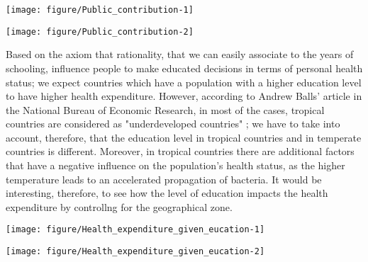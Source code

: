 \documentclass[12pt,a4paper]{article}\usepackage[]{graphicx}\usepackage[]{color}
\makeatletter
\def\maxwidth{ %
  \ifdim\Gin@nat@width>\linewidth
    \linewidth
  \else
    \Gin@nat@width
  \fi
}
\makeatother
\begin{document}
\texttt{[image: figure/Public\_contribution-1]} 

\texttt{[image: figure/Public\_contribution-2]} 


Based on the axiom that  rationality, that we can easily associate to the years of schooling, influence people to make educated decisions in terms of personal health status; we expect countries which have a population with a higher education level to have higher health expenditure. However, according to Andrew Balls' article in the National Bureau of Economic Research, in most of the cases, tropical countries are considered as "underdeveloped countries" ; we have to take into account, therefore,  that the education level in tropical countries and in temperate  countries is different. Moreover, in tropical countries there are additional factors that have a negative influence on the population's health status, as the higher temperature leads to an accelerated propagation of bacteria.  It would be interesting, therefore, to see how the level of education impacts the health expenditure by controllng for the geographical zone.


\texttt{[image: figure/Health\_expenditure\_given\_eucation-1]} 

\texttt{[image: figure/Health\_expenditure\_given\_eucation-2]} 
\end{document}
